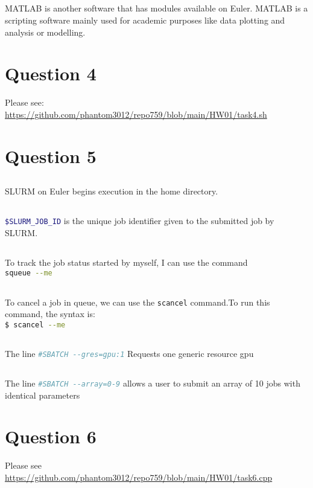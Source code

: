 \documentclass[12pt]{article}
\begin{document}
\subsection{}
MATLAB is another software that has modules available on Euler. MATLAB is a scripting software mainly used for academic purposes like data plotting and analysis or modelling.

\section{Question 4}
Please see: \\ \url{https://github.com/phantom3012/repo759/blob/main/HW01/task4.sh}
\pagebreak

\section{Question 5}

\subsection{}
SLURM on Euler begins execution in the home directory.

\subsection{}
\lstinline[language=bash]|$SLURM_JOB_ID| is the unique job identifier given to the submitted job by SLURM.

\subsection{}
To track the job status started by myself, I can use the command \\ \lstinline[language=bash]|squeue --me|

\subsection{}
To cancel a job in queue, we can use the \lstinline[language=bash]|scancel| command.To run this command, the syntax is: \\
\lstinline[language=bash]|$ scancel --me| \\

\subsection{}
The line \lstinline[language=bash]|#SBATCH --gres=gpu:1| Requests one generic resource gpu

\subsection{}
The line \lstinline[language=bash]|#SBATCH --array=0-9| allows a user to submit an array of 10 jobs with identical parameters


\section{Question 6}
Please see \url{https://github.com/phantom3012/repo759/blob/main/HW01/task6.cpp}
\end{document}
